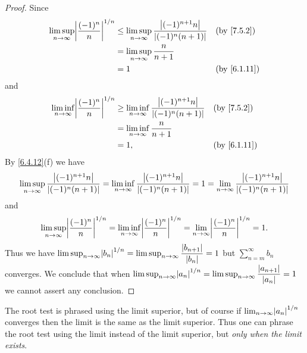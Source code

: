 \begin{proof}
  Since
  \begin{align*}
    \limsup_{n \to \infty} \abs{\dfrac{(-1)^n}{n}}^{1 / n} & \leq \limsup_{n \to \infty} \dfrac{\abs{(-1)^{n + 1} n}}{\abs{(-1)^n (n + 1)}} &  & \by{7.5.2}  \\
                                                           & = \limsup_{n \to \infty} \dfrac{n}{n + 1}                                                       \\
                                                           & = 1                                                                            &  & \by{6.1.11}
  \end{align*}
  and
  \begin{align*}
    \liminf_{n \to \infty} \abs{\dfrac{(-1)^n}{n}}^{1 / n} & \geq \liminf_{n \to \infty} \dfrac{\abs{(-1)^{n + 1} n}}{\abs{(-1)^n (n + 1)}} &  & \by{7.5.2}  \\
                                                           & = \liminf_{n \to \infty} \dfrac{n}{n + 1}                                                       \\
                                                           & = 1,                                                                           &  & \by{6.1.11}
  \end{align*}
  By \cref{6.4.12}(f) we have
  \[
    \limsup_{n \to \infty} \dfrac{\left\lvert(-1)^{n + 1} n\right\rvert}{\left\lvert(-1)^n (n + 1)\right\rvert} = \liminf_{n \to \infty} \dfrac{\left\lvert(-1)^{n + 1} n\right\rvert}{\left\lvert(-1)^n (n + 1)\right\rvert} = 1 = \lim_{n \to \infty} \dfrac{\left\lvert(-1)^{n + 1} n\right\rvert}{\left\lvert(-1)^n (n + 1)\right\rvert}
  \]
  and
  \[
    \limsup_{n \to \infty} \abs{\dfrac{(-1)^n}{n}}^{1 / n} = \liminf_{n \to \infty} \abs{\dfrac{(-1)^n}{n}}^{1 / n} = \lim_{n \to \infty} \abs{\dfrac{(-1)^n}{n}}^{1 / n} = 1.
  \]
  Thus we have \(\limsup_{n \to \infty} \abs{b_n}^{1 / n} = \limsup_{n \to \infty} \dfrac{\abs{b_{n + 1}}}{\abs{b_n}} = 1\) but \(\sum_{n = m}^\infty b_n\) converges.
  We conclude that when \(\limsup_{n \to \infty} \abs{a_n}^{1 / n} = \limsup_{n \to \infty} \dfrac{\abs{a_{n + 1}}}{\abs{a_n}} = 1\) we cannot assert any conclusion.
\end{proof}

\begin{note}
  The root test is phrased using the limit superior, but of course if \(\lim_{n \to \infty} \abs{a_n}^{1 / n}\) converges then the limit is the same as the limit superior.
  Thus one can phrase the root test using the limit instead of the limit superior, but \emph{only when the limit exists}.
\end{note}


